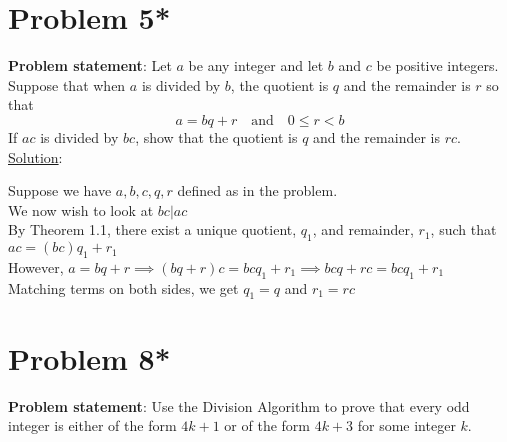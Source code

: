 \documentclass{article} %
\begin{document}
\newpage
\section*{Problem 5*}

\textbf{Problem statement}:
Let $a$ be any integer and let $b$ and $c$ be positive integers.  Suppose that when $a$ is divided by $b$, the quotient is $q$ and the remainder is $r$ so that 
\[a = bq + r     \quad \textrm{and} \quad      0 \leq r < b\]
If $ac$ is divided by $bc$, show that the quotient is $q$ and the remainder is $rc$.
\\


\underline{Solution}: 
\begin{addmargin}[1em]{0em}
Suppose we have $a,b,c, q, r$ defined as in the problem.
\\We now wish to look at $bc|ac$ 
\\By Theorem 1.1, there exist a unique quotient, $q_1$, and remainder, $r_1$, such that $ac = (bc)q_1 + r_1$ 
\\However, $a = bq + r \implies (bq + r)c = bcq_1 + r_1 \implies bcq + rc = bcq_1 + r_1$
\\Matching terms on both sides, we get $q_1 = q$ and $r_1 = rc$
\end{addmargin}


\newpage
\section*{Problem 8*}

\textbf{Problem statement}: 
Use the Division Algorithm to prove that every odd integer is either of the form $4k + 1$ or of the form $4k + 3$ for some integer $k$.
\\
\end{document}
